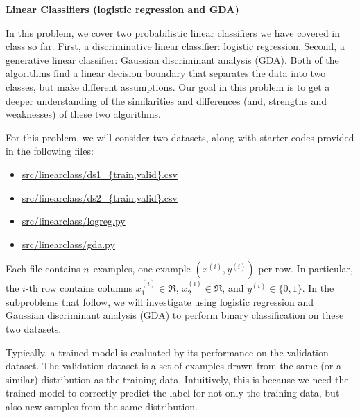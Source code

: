 \item {} {\bf Linear Classifiers (logistic regression and GDA)}

In this problem, we cover two probabilistic linear classifiers we have
covered in class so far. First, a discriminative linear classifier: logistic
regression. Second, a generative linear classifier: Gaussian discriminant
analysis (GDA). Both of the algorithms find a linear decision boundary that
separates the data into two classes, but make different assumptions. Our goal
in this problem is to get a deeper understanding of the similarities and
differences (and, strengths and weaknesses) of these two algorithms.

For this problem, we will consider two datasets, along with starter codes provided in the following
files:
\begin{center}
\begin{itemize} %
	\item \url{src/linearclass/ds1_{train,valid}.csv}
	\item \url{src/linearclass/ds2_{train,valid}.csv}
        \item \url{src/linearclass/logreg.py}
        \item \url{src/linearclass/gda.py}
\end{itemize}
\end{center}
Each file contains ${n}$ examples, one example $(x^{(i)}, y^{(i)})$ per row.
In particular, the $i$-th row contains columns $x^{(i)}_1\in\Re$,
$x^{(i)}_2\in\Re$, and $y^{(i)}\in\{0, 1\}$. In the subproblems that follow, we
will investigate using logistic regression and Gaussian discriminant analysis
(GDA) to perform binary classification on these two datasets.

Typically, a trained model is evaluated by its performance on the validation dataset. The validation dataset is a set of examples drawn from the same (or a similar) distribution as the training data. Intuitively, this is because we need the trained model to correctly predict the label for not only the training data, but also new samples from the same distribution.

